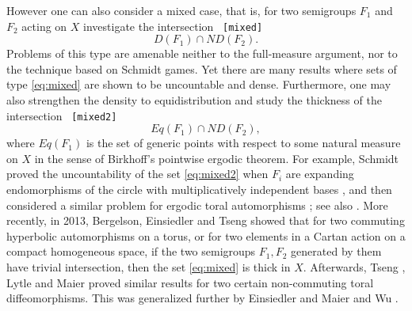 \documentclass[reqno,12pt]{amsart}
\theoremstyle{definition}
\numberwithin{equation}{section}
\newcommand{\RR}{\mathbb{R}}
\newcommand {\comm}[1]   {\textcolor{red}{#1}}
\newif\ifdraft\drafttrue
\newcommand\eq[2]{{\ifdraft{\ \tt [#1]}\else\ignorespaces\fi}\begin{equation}\label{eq:#1}{#2}\end{equation}}
\newcommand {\equ}[1]     {\eqref{eq:#1}}
\begin{document}
\smallskip
However one can also consider 
a mixed case, that is, for two semigroups $F_1$ and $F_2$ acting on $X$ investigate the intersection \eq{mixed}{D(F_1) \cap ND(F_2).} Problems of this type are amenable neither to the full-measure argument, nor to the technique based on Schmidt games. Yet there are %
{many results 
where sets of type \equ{mixed} are shown to be uncountable and dense. 
Furthermore, one may also strengthen the density to equidistribution and study the thickness of the intersection \eq{mixed2}{Eq(F_1)\cap ND(F_2),}
where $Eq(F_1)$ is the set of %
generic points with respect to some natural measure on $X$ in the sense of Birkhoff's pointwise ergodic theorem. 
For example, Schmidt  proved the uncountability of the set \equ{mixed2} when $F_i$ are expanding endomorphisms of the circle with multiplicatively independent bases \cite{s60}, and then considered a similar problem for ergodic toral automorphisms \cite{s64}; see also \cite{BM, BMP}.} 
More recently, in 2013, Bergelson, Einsiedler and Tseng \cite{bet15} showed that for two commuting hyperbolic automorphisms on a torus, or for two elements in a Cartan action on a compact homogeneous space, if the two semigroups $F_1,F_2$ generated by them have trivial intersection, then the set 
\equ{mixed} is thick in $X$. Afterwards, Tseng \cite{T17}, Lytle and Maier \cite{LM18} proved similar results for two certain non-commuting toral diffeomorphisms. {This was generalized further by Einsiedler and Maier \cite{EM20} and  Wu \cite{wu20}.}





\smallskip
\end{document}
